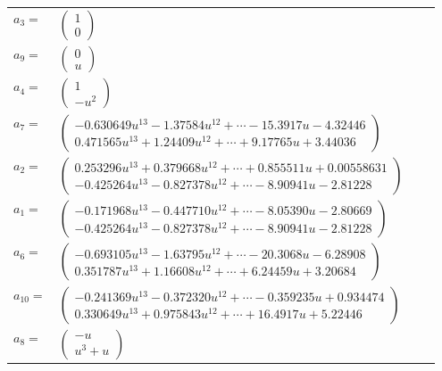 \documentclass[1p]{elsarticle_modified}
\theoremstyle{definition}
\begin{document}
\begin{tabular}{m{7pt} m{180pt} m{7pt} m{180pt} }
\flushright $a_{3}=$&$\begin{pmatrix}1\\0\end{pmatrix}$ \\
\flushright $a_{9}=$&$\begin{pmatrix}0\\u\end{pmatrix}$ \\
\flushright $a_{4}=$&$\begin{pmatrix}1\\- u^2\end{pmatrix}$ \\
\flushright $a_{7}=$&$\begin{pmatrix}-0.630649 u^{13}-1.37584 u^{12}+\cdots-15.3917 u-4.32446\\0.471565 u^{13}+1.24409 u^{12}+\cdots+9.17765 u+3.44036\end{pmatrix}$ \\
\flushright $a_{2}=$&$\begin{pmatrix}0.253296 u^{13}+0.379668 u^{12}+\cdots+0.855511 u+0.00558631\\-0.425264 u^{13}-0.827378 u^{12}+\cdots-8.90941 u-2.81228\end{pmatrix}$ \\
\flushright $a_{1}=$&$\begin{pmatrix}-0.171968 u^{13}-0.447710 u^{12}+\cdots-8.05390 u-2.80669\\-0.425264 u^{13}-0.827378 u^{12}+\cdots-8.90941 u-2.81228\end{pmatrix}$ \\
\flushright $a_{6}=$&$\begin{pmatrix}-0.693105 u^{13}-1.63795 u^{12}+\cdots-20.3068 u-6.28908\\0.351787 u^{13}+1.16608 u^{12}+\cdots+6.24459 u+3.20684\end{pmatrix}$ \\
\flushright $a_{10}=$&$\begin{pmatrix}-0.241369 u^{13}-0.372320 u^{12}+\cdots-0.359235 u+0.934474\\0.330649 u^{13}+0.975843 u^{12}+\cdots+16.4917 u+5.22446\end{pmatrix}$ \\
\flushright $a_{8}=$&$\begin{pmatrix}- u\\u^3+u\end{pmatrix}$ \\

\end{tabular}
\end{document}
